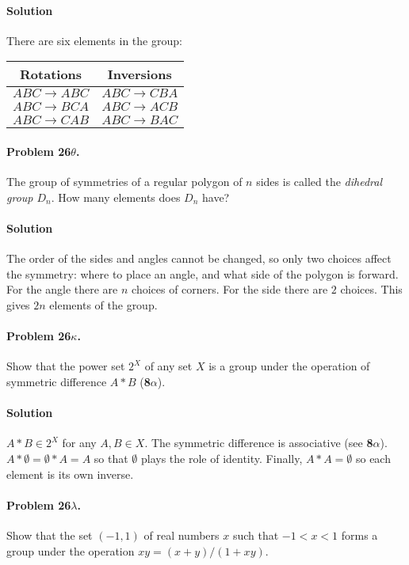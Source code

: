 \paragraph*{Solution}
There are six elements in the group:
\begin{center}
\begin{tabular}{c|c}
Rotations & Inversions \\
\hline
$ABC \rightarrow ABC$ & $ABC \rightarrow CBA $ \\
$ABC \rightarrow BCA$ & $ABC \rightarrow ACB $ \\
$ABC \rightarrow CAB$ & $ABC \rightarrow BAC $
\end{tabular}
\end{center}

\paragraph{Problem 26$\theta$.}
The group of symmetries of a regular polygon of $n$ sides is called the
\textit{dihedral group $D_n$}. How many elements does $D_n$ have?

\paragraph*{Solution}
The order of the sides and angles cannot be changed, so only two choices
affect the symmetry: where to place an angle, and what side of the polygon
is forward. For the angle there are $n$ choices of corners. For the side
there are $2$ choices. This gives $2n$ elements of the group.

\paragraph{Problem 26$\kappa$.}
Show that the power set $2^X$ of any set $X$ is a group under the operation
of symmetric difference $A * B$ (\textbf{8$\alpha$}).

\paragraph*{Solution}
$A * B \in 2^X $ for any $A, B \in X$. The symmetric difference is associative
(see \textbf{8$\alpha$}). $A*\emptyset = \emptyset*A = A$ so that $\emptyset$
plays the role of identity. Finally, $ A*A = \emptyset $ so each element is its
own inverse.

\paragraph{Problem 26$\lambda$.}
Show that the set $(-1, 1)$ of real numbers $x$ such that $ -1 < x < 1$ forms
a group under the operation $x y = (x +y) / (1 + xy)$.

